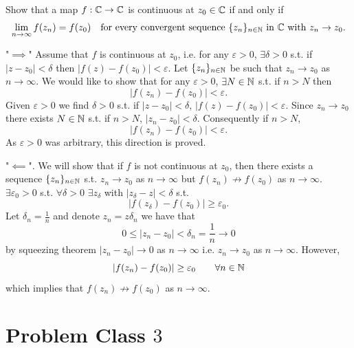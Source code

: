 \documentclass[10pt, a4paper]{article}
\begin{document}
\begin{problem}
    Show that a map $f : \mathbb{C} \to \mathbb{C}$ is continuous at $z_0 \in \mathbb{C}$ if and only if
    \[
    \lim_{n \to \infty}f(z_n) = f(z_0)\quad\text{for every convergent sequence $\{z_n\}_{n \in \mathbb{N}}$ in $\mathbb{C}$ with $z_n \to z_0$}.
    \]

    \begin{solution}
        "$\implies$"
        Assume that $f$ is continuous at $z_0$,
        i.e. for any $\varepsilon > 0$,
        $\exists \delta > 0$ s.t. if $|z - z_0| < \delta$ then $|f(z) - f(z_0)| < \varepsilon$.
        Let $\{z_n\}_{n \in \mathbb{N}}$ be such that $z_n \to z_0$ as $n \to \infty$.
        We would like to show that for any $\varepsilon > 0$,
        $\exists N \in \mathbb{N}$ s.t. if $n > N$ then
        \[
        |f(z_n) - f(z_0)| < \varepsilon.
        \]
        Given $\varepsilon > 0$ we find $\delta > 0$ s.t. if $|z - z_0| < \delta$,
        $|f(z) - f(z_0)| < \varepsilon$.
        Since $z_n \to z_0$ there exists $N \in \mathbb{N}$ s.t. if $n > N$,
        $|z_n - z_0| < \delta$.
        Consequently if $n > N$,
        \[
        |f(z_n) - f(z_0)| < \varepsilon.
        \]
        As $\varepsilon > 0$ was arbitrary,
        this direction is proved.
        
        "$\impliedby$".
        We will show that if $f$ is not continuous at $z_0$,
        then there exists a sequence $\{z_n\}_{n \in \mathbb{N}}$ s.t. $z_n \to z_0$ as $n \to \infty$ but $f(z_n) \not\to f(z_0)$ as $n \to \infty$.
        $\exists \varepsilon_0 > 0$ s.t. $\forall \delta > 0$ $\exists z_{\delta}$ with $|z_{\delta} - z| < \delta$ s.t.
        \[
        |f(z_{\delta}) - f(z_0)| \geq \varepsilon_0.
        \]
        Let $\delta_n = \frac{1}{n}$ and denote $z_n = z\delta_n$ we have that
        \[
        0 \leq |z_n - z_0| < \delta_n = \frac{1}{n} \to 0
        \]
        by squeezing theorem $|z_n - z_0| \to 0$ as $n \to \infty$ i.e. $z_n \to z_0$ as $n \to \infty$.
        However,
        \[
        |f(z_n) - f(z_0)| \geq \varepsilon_0\qquad \forall n \in \mathbb{N}
        \]
        which implies that $f(z_n) \not\to f(z_0)$ as $n \to \infty$.
    \end{solution}
\end{problem}

\newpage

\section{Problem Class \texorpdfstring{$3$}{}}
\end{document}
